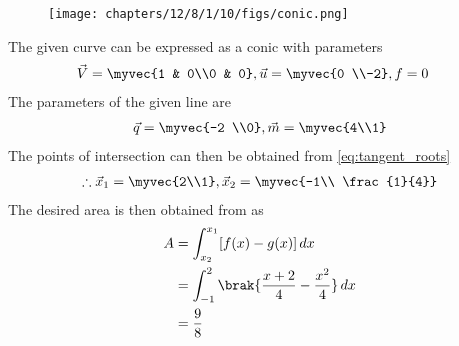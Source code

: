 	\begin{figure}[H]
		\centering
 \texttt{[image: chapters/12/8/1/10/figs/conic.png]}
		\caption{}
		\label{fig:12/8/1/10}
  	\end{figure}
The given curve  can be expressed as a conic with parameters
\begin{align}
	\vec{V} &= \myvec{1 & 0\\0 & 0}, \vec{u} = \myvec{0 \\-2}, f = 0
	\end{align}
The parameters of the given line are
\begin{align}
\vec{q} = \myvec{-2 \\0} , \vec{m}=\myvec{4\\1}
\end{align}
The points of intersection can then be obtained from \eqref{eq:tangent_roots} 
\begin{align}
\therefore \vec{x}_1=\myvec{2\\1} , \vec{x}_2=\myvec{-1\\ \frac{1}{4}}
\end{align}
The desired area is then obtained 
from 		
as
\begin{align}
	A&=\int_{x_2}^{x_1} [f(x)-g(x)] \,dx
	\\
	&=\int_{-1}^{2} \brak{\frac{x+2}{4}-\frac{x^2}{4}} \,dx
	\\
	& = \frac{9}{8} 
\end{align}
